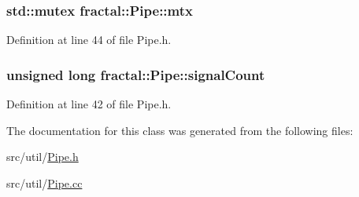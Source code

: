 \hypertarget{classfractal_1_1Pipe_aa318a819fc2ba87eacbb305a10c02122}{
\subsubsection[{mtx}]{\setlength{\rightskip}{0pt plus 5cm}std\+::mutex fractal\+::\+Pipe\+::mtx\hspace{0.3cm}{\ttfamily [protected]}}}\label{classfractal_1_1Pipe_aa318a819fc2ba87eacbb305a10c02122}


Definition at line 44 of file Pipe.\+h.

\hypertarget{classfractal_1_1Pipe_ade5cb784c7d73bd720e60e0101f62e7b}{
\subsubsection[{signal\+Count}]{\setlength{\rightskip}{0pt plus 5cm}unsigned long fractal\+::\+Pipe\+::signal\+Count\hspace{0.3cm}{\ttfamily [protected]}}}\label{classfractal_1_1Pipe_ade5cb784c7d73bd720e60e0101f62e7b}


Definition at line 42 of file Pipe.\+h.



The documentation for this class was generated from the following files\+:\begin{DoxyCompactItemize}
\item 
src/util/\hyperlink{Pipe_8h}{Pipe.\+h}\item 
src/util/\hyperlink{Pipe_8cc}{Pipe.\+cc}\end{DoxyCompactItemize}
